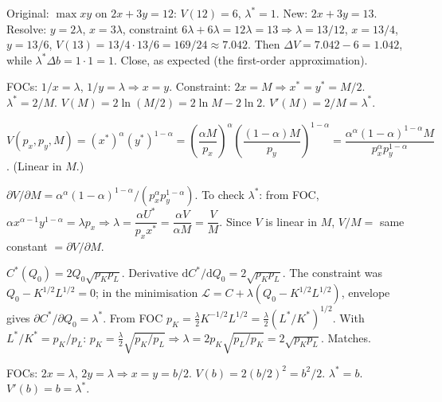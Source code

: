 \begin{solutions}
  \item Original: $\max x y$ on $2 x + 3 y = 12$: $V(12) = 6$,
        $\lambda^* = 1$. New: $2 x + 3 y = 13$. Resolve: $y = 2 \lambda$,
        $x = 3 \lambda$, constraint
        $6 \lambda + 6 \lambda = 12 \lambda = 13 \Rightarrow
        \lambda = 13/12$, $x = 13/4$, $y = 13/6$,
        $V(13) = 13/4 \cdot 13/6 = 169/24 \approx 7.042$. Then
        $\Delta V = 7.042 - 6 = 1.042$, while
        $\lambda^* \Delta b = 1 \cdot 1 = 1$. Close, as expected (the
        first-order approximation).

  \item FOCs: $1/x = \lambda$, $1/y = \lambda \Rightarrow x = y$.
        Constraint: $2 x = M \Rightarrow x^* = y^* = M/2$.
        $\lambda^* = 2/M$. $V(M) = 2 \ln(M/2) = 2 \ln M - 2 \ln 2$.
        $V'(M) = 2/M = \lambda^*$. \checkmark

  \item $V(p_x, p_y, M) = (x^*)^\alpha (y^*)^{1 - \alpha}
        = \left(\dfrac{\alpha M}{p_x}\right)^\alpha
          \left(\dfrac{(1 - \alpha) M}{p_y}\right)^{1 - \alpha}
        = \dfrac{\alpha^\alpha (1 - \alpha)^{1 - \alpha} M}{p_x^\alpha
          p_y^{1 - \alpha}}$. (Linear in $M$.)

  \item $\partial V/\partial M = \alpha^\alpha
        (1 - \alpha)^{1 - \alpha}/(p_x^\alpha p_y^{1 - \alpha})$. To check
        $\lambda^*$: from FOC,
        $\alpha x^{\alpha - 1} y^{1 - \alpha} = \lambda p_x \Rightarrow
        \lambda = \dfrac{\alpha U^*}{p_x x^*} = \dfrac{\alpha V}{\alpha M}
        = \dfrac{V}{M}$. Since $V$ is linear in $M$, $V/M = $ same
        constant $= \partial V/\partial M$. \checkmark

  \item $C^*(Q_0) = 2 Q_0 \sqrt{p_K p_L}$. Derivative
        $\mathrm{d}C^*/\mathrm{d}Q_0 = 2 \sqrt{p_K p_L}$. The constraint
        was $Q_0 - K^{1/2} L^{1/2} = 0$; in the minimisation
        $\mathcal{L} = C + \lambda(Q_0 - K^{1/2} L^{1/2})$, envelope gives
        $\partial C^*/\partial Q_0 = \lambda^*$. From FOC
        $p_K = \tfrac{\lambda}{2} K^{-1/2} L^{1/2}
        = \tfrac{\lambda}{2}(L^*/K^*)^{1/2}$. With $L^*/K^* = p_K/p_L$:
        $p_K = \tfrac{\lambda}{2} \sqrt{p_K/p_L} \Rightarrow
        \lambda = 2 p_K \sqrt{p_L/p_K} = 2 \sqrt{p_K p_L}$. Matches.

  \item FOCs: $2 x = \lambda$, $2 y = \lambda \Rightarrow x = y = b/2$.
        $V(b) = 2(b/2)^2 = b^2/2$. $\lambda^* = b$.
        $V'(b) = b = \lambda^*$. \checkmark


\end{solutions}
